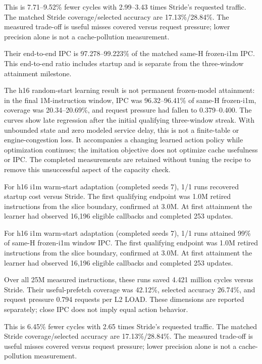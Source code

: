 \documentclass[10pt]{article}
\begin{document}
This is 7.71--9.52\% fewer cycles with 2.99--3.43 times Stride's requested traffic. The matched Stride coverage/selected accuracy are 17.13\%/28.84\%. The measured trade-off is useful misses covered versus request pressure; lower precision alone is not a cache-pollution measurement.

Their end-to-end IPC is 97.278--99.223\% of the matched same-H frozen-i1m IPC. This end-to-end ratio includes startup and is separate from the three-window attainment milestone.

The h16 random-start learning result is not permanent frozen-model attainment: in the final 1M-instruction window, IPC was 96.32--96.41\% of same-H frozen-i1m, coverage was 20.34--20.69\%, and request pressure had fallen to 0.379--0.400. The curves show late regression after the initial qualifying three-window streak. With unbounded state and zero modeled service delay, this is not a finite-table or engine-congestion loss. It accompanies a changing learned action policy while optimization continues; the imitation objective does not optimize cache usefulness or IPC. The completed measurements are retained without tuning the recipe to remove this unsuccessful aspect of the capacity check.

For h16 i1m warm-start adaptation (completed seeds 7), 1/1 runs recovered startup cost versus Stride. The first qualifying endpoint was 1.0M retired instructions from the slice boundary, confirmed at 3.0M. At first attainment the learner had observed 16,196 eligible callbacks and completed 253 updates.

For h16 i1m warm-start adaptation (completed seeds 7), 1/1 runs attained 99\% of same-H frozen-i1m window IPC. The first qualifying endpoint was 1.0M retired instructions from the slice boundary, confirmed at 3.0M. At first attainment the learner had observed 16,196 eligible callbacks and completed 253 updates.

Over all 25M measured instructions, these runs saved 4.421 million cycles versus Stride. Their useful-prefetch coverage was 42.12\%, selected accuracy 26.74\%, and request pressure 0.794 requests per L2 LOAD. These dimensions are reported separately; close IPC does not imply equal action behavior.

This is 6.45\% fewer cycles with 2.65 times Stride's requested traffic. The matched Stride coverage/selected accuracy are 17.13\%/28.84\%. The measured trade-off is useful misses covered versus request pressure; lower precision alone is not a cache-pollution measurement.
\end{document}
